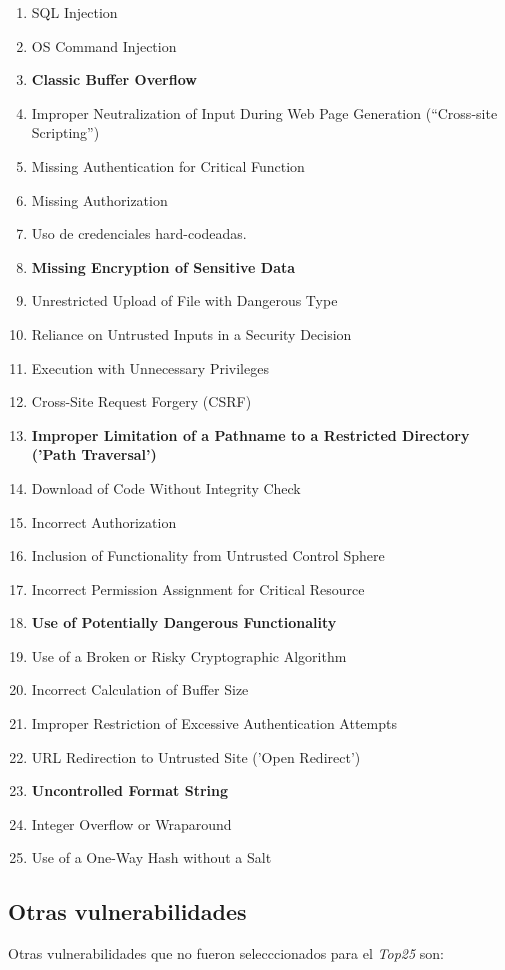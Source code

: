 \documentclass[a4paper,10pt]{article}
\begin{document}
\begin{enumerate}
    \item SQL Injection
    \item OS Command Injection
    \item \textbf{Classic Buffer Overflow}
    \item Improper Neutralization of Input During Web Page Generation (``Cross-site Scripting'')
    \item Missing Authentication for Critical Function
    \item Missing Authorization
    \item Uso de credenciales hard-codeadas.
    \item \textbf{Missing Encryption of Sensitive Data}
    \item Unrestricted Upload of File with Dangerous Type
    \item Reliance on Untrusted Inputs in a Security Decision
    \item Execution with Unnecessary Privileges
    \item Cross-Site Request Forgery (CSRF)
    \item \textbf{Improper Limitation of a Pathname to a Restricted Directory ('Path Traversal')}
    \item Download of Code Without Integrity Check
    \item Incorrect Authorization
    \item Inclusion of Functionality from Untrusted Control Sphere
    \item Incorrect Permission Assignment for Critical Resource
    \item \textbf{Use of Potentially Dangerous Functionality}
    \item Use of a Broken or Risky Cryptographic Algorithm
    \item Incorrect Calculation of Buffer Size
    \item Improper Restriction of Excessive Authentication Attempts
    \item URL Redirection to Untrusted Site ('Open Redirect')
    \item \textbf{Uncontrolled Format String}
    \item Integer Overflow or Wraparound
    \item Use of a One-Way Hash without a Salt
\end{enumerate}

\subsection{Otras vulnerabilidades}
Otras vulnerabilidades que no fueron selecccionados para el \emph{Top25} son:
\end{document}
